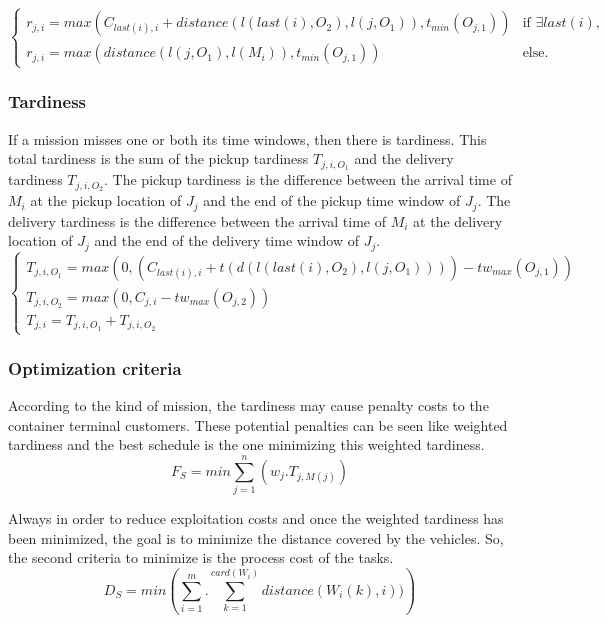 \documentclass[a4paper,10pt]{article}
\begin{document}
\begin{equation*}
 \begin{cases}
    r_{j,i} = max(C_{last(i),i} + distance(l(last(i),O_2),l(j,O_1)) , t_{min}(O_{j,1})) & \text{if $\exists last(i)$,}\\
    r_{j,i} = max(distance(l(j,O_1) , l(M_i)) , t_{min}(O_{j,1})) & \text{else.}
\end{cases}
\end{equation*}

\subsubsection{Tardiness}
If a mission misses one or both its time windows, then there is tardiness. This total tardiness is the sum of the pickup tardiness $T_{j,i,O_1}$ and the delivery tardiness $T_{j,i,O_2}$. The pickup tardiness is the difference between the arrival time of $M_i$ at the pickup location of $J_j$ and the end of the pickup time window of $J_j$. The delivery tardiness is the difference between the arrival time of $M_i$ at the delivery location of $J_j$ and the end of the delivery time window of $J_j$.
\begin{equation*}
 \begin{cases}
    T_{j,i,O_1} = max(0 , (C_{last(i),i} + t(d(l(last(i),O_2) , l(j, O_1)))) - tw_{max}(O_{j,1}))\\
    T_{j,i,O_2} = max(0 ,C_{j,i} - tw_{max}(O_{j,2}))\\
    T_{j,i} = T_{j,i,O_1} + T_{j,i,O_2}
\end{cases}
\end{equation*}

\subsubsection{Optimization criteria}

According to the kind of mission, the tardiness may cause penalty costs to the container terminal customers. These potential penalties can be seen like weighted tardiness and the best schedule is the one minimizing this weighted tardiness.
\begin{equation*}
    F_S = min \sum_{j=1}^{n}(w_j.T_{j,M(j)})
\end{equation*}

Always in order to reduce exploitation costs and once the weighted tardiness has been minimized, the goal is to minimize the distance covered by the vehicles. So, the second criteria to minimize is the process cost of the tasks.
\begin{equation*}
    D_S = min \left(\sum_{i=1}^{m}.\sum_{k=1}^{card(W_i)} distance(W_i(k), i))\right)
\end{equation*}
\end{document}
